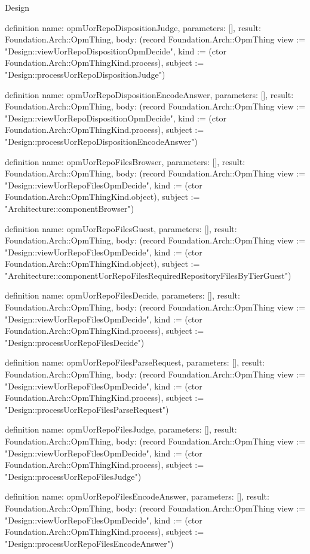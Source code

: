 \begin{lexlean}{Design}
\begin{semanticmodule}
definition{
  name: opmUorRepoDispositionJudge,
  parameters: [],
  result: Foundation.Arch::OpmThing,
  body: (record Foundation.Arch::OpmThing {view := "Design::viewUorRepoDispositionOpmDecide", kind := (ctor Foundation.Arch::OpmThingKind.process), subject := "Design::processUorRepoDispositionJudge"})
}

definition{
  name: opmUorRepoDispositionEncodeAnswer,
  parameters: [],
  result: Foundation.Arch::OpmThing,
  body: (record Foundation.Arch::OpmThing {view := "Design::viewUorRepoDispositionOpmDecide", kind := (ctor Foundation.Arch::OpmThingKind.process), subject := "Design::processUorRepoDispositionEncodeAnswer"})
}

definition{
  name: opmUorRepoFilesBrowser,
  parameters: [],
  result: Foundation.Arch::OpmThing,
  body: (record Foundation.Arch::OpmThing {view := "Design::viewUorRepoFilesOpmDecide", kind := (ctor Foundation.Arch::OpmThingKind.object), subject := "Architecture::componentBrowser"})
}

definition{
  name: opmUorRepoFilesGuest,
  parameters: [],
  result: Foundation.Arch::OpmThing,
  body: (record Foundation.Arch::OpmThing {view := "Design::viewUorRepoFilesOpmDecide", kind := (ctor Foundation.Arch::OpmThingKind.object), subject := "Architecture::componentUorRepoFilesRequiredRepositoryFilesByTierGuest"})
}

definition{
  name: opmUorRepoFilesDecide,
  parameters: [],
  result: Foundation.Arch::OpmThing,
  body: (record Foundation.Arch::OpmThing {view := "Design::viewUorRepoFilesOpmDecide", kind := (ctor Foundation.Arch::OpmThingKind.process), subject := "Design::processUorRepoFilesDecide"})
}

definition{
  name: opmUorRepoFilesParseRequest,
  parameters: [],
  result: Foundation.Arch::OpmThing,
  body: (record Foundation.Arch::OpmThing {view := "Design::viewUorRepoFilesOpmDecide", kind := (ctor Foundation.Arch::OpmThingKind.process), subject := "Design::processUorRepoFilesParseRequest"})
}

definition{
  name: opmUorRepoFilesJudge,
  parameters: [],
  result: Foundation.Arch::OpmThing,
  body: (record Foundation.Arch::OpmThing {view := "Design::viewUorRepoFilesOpmDecide", kind := (ctor Foundation.Arch::OpmThingKind.process), subject := "Design::processUorRepoFilesJudge"})
}

definition{
  name: opmUorRepoFilesEncodeAnswer,
  parameters: [],
  result: Foundation.Arch::OpmThing,
  body: (record Foundation.Arch::OpmThing {view := "Design::viewUorRepoFilesOpmDecide", kind := (ctor Foundation.Arch::OpmThingKind.process), subject := "Design::processUorRepoFilesEncodeAnswer"})
}


\end{semanticmodule}
\end{lexlean}
